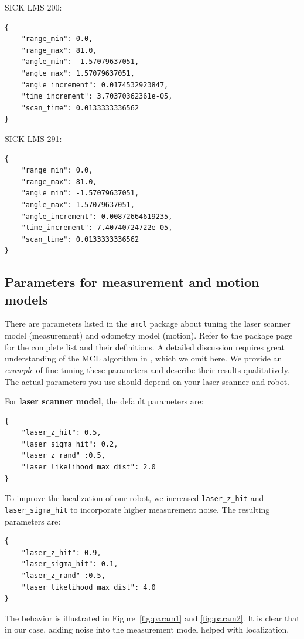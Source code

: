 \documentclass[12pt]{article}
\begin{document}
\noindent SICK LMS 200:
\lstset{language=json}
\begin{lstlisting}
{   
    "range_min": 0.0,
    "range_max": 81.0,
    "angle_min": -1.57079637051,
    "angle_max": 1.57079637051,
    "angle_increment": 0.0174532923847,
    "time_increment": 3.70370362361e-05,
    "scan_time": 0.0133333336562
}
\end{lstlisting}

\noindent SICK LMS 291:
\lstset{language=json}
\begin{lstlisting}
{   
    "range_min": 0.0,
    "range_max": 81.0,
    "angle_min": -1.57079637051,
    "angle_max": 1.57079637051,
    "angle_increment": 0.00872664619235,
    "time_increment": 7.40740724722e-05,
    "scan_time": 0.0133333336562
}
\end{lstlisting}


\subsection{Parameters for measurement and motion models}
There are parameters listed in the \texttt{amcl} package about tuning the laser scanner model (measurement)  and odometry model (motion). Refer to the package page for the complete list and their definitions. A detailed discussion requires great understanding of the MCL algorithm in \cite{thrun2005probabilistic}, which we omit here. We provide an \emph{example} of fine tuning these parameters and describe their results qualitatively. The actual parameters you use should depend on your laser scanner and robot.

For \textbf{laser scanner model}, the default parameters are:

\lstset{language=json}
\begin{lstlisting}
{
    "laser_z_hit": 0.5,
    "laser_sigma_hit": 0.2,
    "laser_z_rand" :0.5,
    "laser_likelihood_max_dist": 2.0
}
\end{lstlisting}

To improve the localization of our robot, we increased \texttt{laser\_z\_hit} and \texttt{laser\_sigma\_hit} to incorporate higher measurement noise. The resulting parameters are:

\lstset{language=json}
\begin{lstlisting}
{
    "laser_z_hit": 0.9,
    "laser_sigma_hit": 0.1,
    "laser_z_rand" :0.5,
    "laser_likelihood_max_dist": 4.0
}
\end{lstlisting}
The behavior is illustrated in Figure~\ref{fig:param1} and \ref{fig:param2}. It is clear that in our case, adding noise into the measurement model helped with localization.
\end{document}
